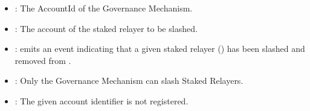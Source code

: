 \documentclass[a4paper,10pt,english]{sphinxmanual}
\begin{document}

\begin{itemize}
\item {} 
: The AccountId of the Governance Mechanism.

\item {} 
: The account of the staked relayer to be slashed.

\end{itemize}

\begin{itemize}
\item {} 
: emits an event indicating that a given staked relayer () has been slashed and removed from .

\end{itemize}

\begin{itemize}
\item {} 
: Only the Governance Mechanism can slash Staked Relayers.

\item {} 
: The given account identifier is not registered.

\end{itemize}
\end{document}
